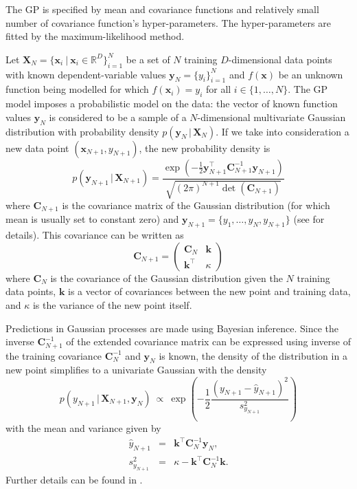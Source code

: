 \documentclass{itatnew}
\newcommand{\xx}{\mathrm{\mathbf{x}}}
\newcommand{\yy}{\mathrm{\mathbf{y}}}
\newcommand{\XX}{\mathrm{\mathbf{X}}}
\newcommand{\CC}{\mathrm{\mathbf{C}}}
\begin{document}
The GP is specified by mean and covariance functions and relatively small number of covariance function's hyper-parameters. The hyper-parameters are fitted by the maximum-likelihood method.

Let $\XX_N = \{\xx_i \ | \ \xx_i \in \mathbb{R}^{D}\}_{i=1}^{N}$ be a set of $N$ training $D$-dimensional data points with known dependent-variable values $\yy_N = \{y_i\}_{i=1}^{N}$ and $f(\xx)$ be an unknown function being modelled for which $f(\xx_i) = y_i$ for all $i \in \{1,\ldots,N\}$. The GP model imposes a probabilistic model on the data: the vector of known function values $\yy_N$ is considered to be a sample of a $N$-dimensional multivariate Gaussian distribution with probability density $p(\yy_N \, | \, \XX_N)$. If we take into consideration a new data point $(\xx_{N+1}, y_{N+1})$, the new probability density is
\begin{equation}
p(\yy_{N+1} \, | \, \XX_{N+1}) = \frac { \exp(-\frac{1}{2} \yy^\top_{N+1} \CC^{-1}_{N+1} \yy_{N+1}) } { \sqrt{(2\pi)^{N+1} \det(\CC_{N+1})} }
\end{equation}
where $\CC_{N+1}$ is the covariance matrix of the Gaussian distribution (for which mean is usually set to constant zero) and 
$\yy_{N+1} = \{y_1,\ldots,y_N, y_{N+1}\}$ (see \cite{buche_accelerating_2005} for details). This covariance can be written as
\begin{equation}
\CC_{N+1} = \left( \begin{array}{cc} \CC_N & \mathbf{k} \\ \mathbf{k}^\top & \kappa \end{array} \right)
\end{equation}
where $\CC_N$ is the covariance of the Gaussian distribution given the $N$ training data points, $\mathbf{k}$ is a vector of covariances between the new point and training data, and $\kappa$ is the variance of the new point itself.

Predictions in Gaussian processes are made using Bayesian inference. Since the inverse $\CC^{-1}_{N+1}$ of the extended covariance matrix can be expressed using inverse of the training covariance $\CC^{-1}_N$ and $\yy_N$ is known, the density of the distribution in a new point simplifies to a univariate Gaussian with the density
\begin{equation}
p(y_{N+1} \, | \, \XX_{N+1}, \yy_N) \ \varpropto \ \exp \left( -\frac{1}{2} \frac {(y_{N+1} - \hat{y}_{N+1})^2} {s^2_{y_{N+1}}} \right)
\label{univariate-density}
\end{equation}
with the mean and variance given by
\begin{eqnarray}
\hat{y}_{N+1} & = & \mathbf{k}^\top \CC^{-1}_N \yy_N, \\
s^2_{y_{N+1}} & = & \kappa - \mathbf{k}^\top \CC^{-1}_N \mathbf{k}.
\end{eqnarray}
Further details can be found in \cite{buche_accelerating_2005}.
\end{document}
